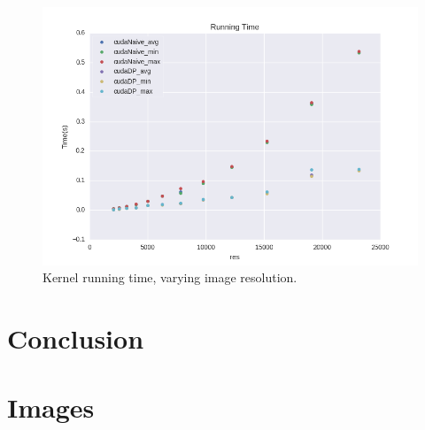 \documentclass[letterpaper]{article}
\begin{document}
\begin{multicols}{2}
\begin{figure}[H]
  \includegraphics[width=\linewidth]{experiments3/running_time_graph_exp_res.png}
  \caption{Kernel running time, varying image resolution.}
\end{figure}



  \section{Conclusion}



\end{multicols}

\section{Images}
\end{document}
